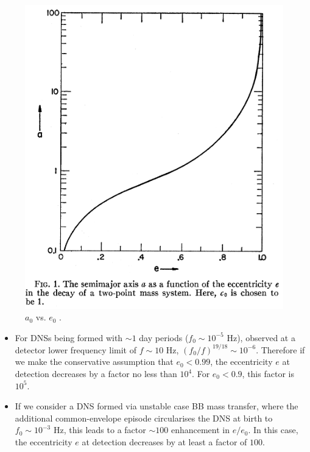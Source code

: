 \documentclass[12pt]{article}
\begin{document}
\begin{figure}
	\centering
	\includegraphics[width=0.5\columnwidth]{Figures/a(e)}
	\caption{$a_0$ vs. $e_0$ \citep{Peters1964}.}
	\label{fig:a(e)}
\end{figure}


\begin{itemize}
	\item For \acp{DNS} being formed with $\sim 1$ day periods ($f_0\sim 10^{-5}$ Hz), observed at a detector lower frequency limit of $f \sim 10$ Hz, $(f_0/f)^{19/18} \sim 10^{-6}$. Therefore if we make the conservative assumption that $e_0<0.99$, the eccentricity $e$ at detection decreases by a factor no less than $10^4$. For $e_0<0.9$, this factor is $10^5$.
	\item If we consider a \ac{DNS} formed via unstable case BB mass transfer, where the additional common-envelope episode circularises the \ac{DNS} at birth to $f_0\sim 10^{-3}$ Hz, this leads to a factor $\sim 100$ enhancement in $e/e_0$. In this case, the eccentricity $e$ at detection decreases by at least a factor of $100$.
\end{itemize}





















\end{document}
